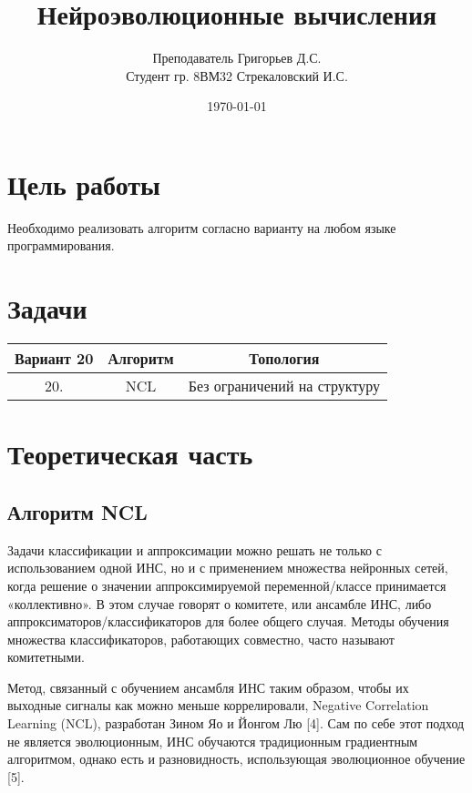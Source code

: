 \documentclass[12pt]{extarticle}
\title{Нейроэволюционные вычисления}
\author{}
\author{
Преподаватель       Григорьев Д.С.\\
Студент гр. 8ВМ32   Стрекаловский И.С.}
\date{\today}
\begin{document}
\maketitle

\section{Цель работы}

Необходимо реализовать алгоритм согласно варианту на любом языке программирования.

\section{Задачи}

\begin{table}[h!]
\centering
\begin{tabular}{|c|c|c|} %
\hline %
Вариант 20 & Алгоритм & Топология \\ %
\hline %
20. & NCL & Без ограничений на структуру \\ %
\hline %
\end{tabular}
\end{table}

\section{Теоретическая часть}

\subsection{Алгоритм NCL}

Задачи классификации и аппроксимации можно решать не только с использованием одной ИНС, но и с применением множества нейронных сетей, когда решение о значении аппроксимируемой переменной/классе принимается «коллективно». В этом случае
говорят о комитете, или ансамбле ИНС, либо аппроксиматоров/классификаторов для более общего случая. Методы обучения множества классификаторов, работающих совместно, часто называют комитетными.

Метод, связанный с обучением ансамбля ИНС таким образом, чтобы их выходные сигналы как можно меньше коррелировали, Negative Correlation Learning (NCL), разработан Зином Яо и Йонгом Лю [4]. Сам по себе этот подход не является эволюционным, ИНС обучаются традиционным градиентным алгоритмом, однако есть и разновидность, использующая эволюционное обучение [5].
\end{document}
